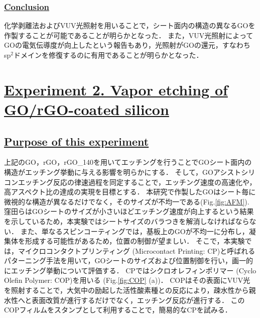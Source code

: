 \documentclass[platex,dvipdfmx]{jlreq}			%
\begin{document}
\subsubsection*{\ul{Conclusion}}
化学剥離法およびVUV光照射を用いることで，シート面内の構造の異なるGOを作製することが可能であることが明らかとなった．
また，VUV光照射によってGOの電気伝導度が向上したという報告もあり，光照射がGOの還元，すなわちsp$^2$ドメインを修復するのに有用であることが明らかとなった．

\newpage
\section*{\ul{Experiment 2. Vapor etching of GO/rGO-coated silicon}}

\subsection*{\ul{Purpose of this experiment}}
上記のGO，rGO，rGO\_140を用いてエッチングを行うことでGOシート面内の構造がエッチング挙動に与える影響を明らかにする．
そして，GOアシストシリコンエッチング反応の律速過程を同定することで，エッチング速度の高速化や，高アスペクト比の達成の実現を目標とする．
本研究で作製したGOはシート毎に微視的な構造が異なるだけでなく，そのサイズが不均一である(Fig.\ref{fig:AFM}).
窪田らはGOシートのサイズが小さいほどエッチング速度が向上するという結果を示しているため\supercite{kubota_vapor-phase_2022}，本実験ではシートサイズのバラつきを解消しなければならない．
また、単なるスピンコーティングでは，基板上のGOが不均一に分布し，凝集体を形成する可能性があるため，位置の制御が望ましい．
そこで，本実験では，マイクロコンタクトプリンティング (Microcontact Printing: \textmu CP)と呼ばれるパターニング手法を用いて\supercite{xiao_micro-contact_2014}，GOシートのサイズおよび位置制御を行い，画一的にエッチング挙動について評価する．
\textmu CPではシクロオレフィンポリマー (Cyclo Olefin Polymer: COP)を用いる (Fig.\ref{fig:COP} (a))．
COPはその表面にVUV光を照射することで，大気中の励起した活性酸素種との反応により，疎水性から親水性へと表面改質が進行するだけでなく，エッチング反応が進行する\supercite{sugimura_vacuum_2012}．
このCOPフィルムをスタンプとして利用することで，簡易的な\textmu CPを試みる．
\end{document}
